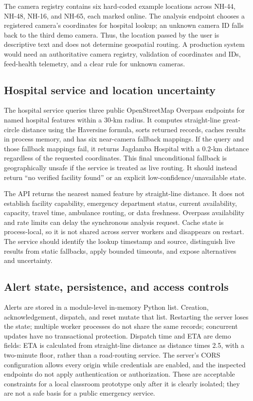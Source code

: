 \documentclass[12pt,a4paper]{article}
\begin{document}
The camera registry contains six hard-coded example locations across NH-44, NH-48, NH-16, and NH-65, each marked online. The analysis endpoint chooses a registered camera's coordinates for hospital lookup; an unknown camera ID falls back to the third demo camera. Thus, the location passed by the user is descriptive text and does not determine geospatial routing. A production system would need an authoritative camera registry, validation of coordinates and IDs, feed-health telemetry, and a clear rule for unknown cameras.

\subsection{Hospital service and location uncertainty}
The hospital service queries three public OpenStreetMap Overpass endpoints for named hospital features within a 30-km radius. It computes straight-line great-circle distance using the Haversine formula, sorts returned records, caches results in process memory, and has six near-camera fallback mappings. If the query and those fallback mappings fail, it returns Jagdamba Hospital with a 0.2-km distance regardless of the requested coordinates. This final unconditional fallback is geographically unsafe if the service is treated as live routing. It should instead return ``no verified facility found'' or an explicit low-confidence/unavailable state.

The API returns the nearest named feature by straight-line distance. It does not establish facility capability, emergency department status, current availability, capacity, travel time, ambulance routing, or data freshness. Overpass availability and rate limits can delay the synchronous analysis request. Cache state is process-local, so it is not shared across server workers and disappears on restart. The service should identify the lookup timestamp and source, distinguish live results from static fallbacks, apply bounded timeouts, and expose alternatives and uncertainty.

\subsection{Alert state, persistence, and access controls}
Alerts are stored in a module-level in-memory Python list. Creation, acknowledgement, dispatch, and reset mutate that list. Restarting the server loses the state; multiple worker processes do not share the same records; concurrent updates have no transactional protection. Dispatch time and ETA are demo fields: ETA is calculated from straight-line distance as distance times 2.5, with a two-minute floor, rather than a road-routing service. The server's CORS configuration allows every origin while credentials are enabled, and the inspected endpoints do not apply authentication or authorization. These are acceptable constraints for a local classroom prototype only after it is clearly isolated; they are not a safe basis for a public emergency service.
\end{document}
